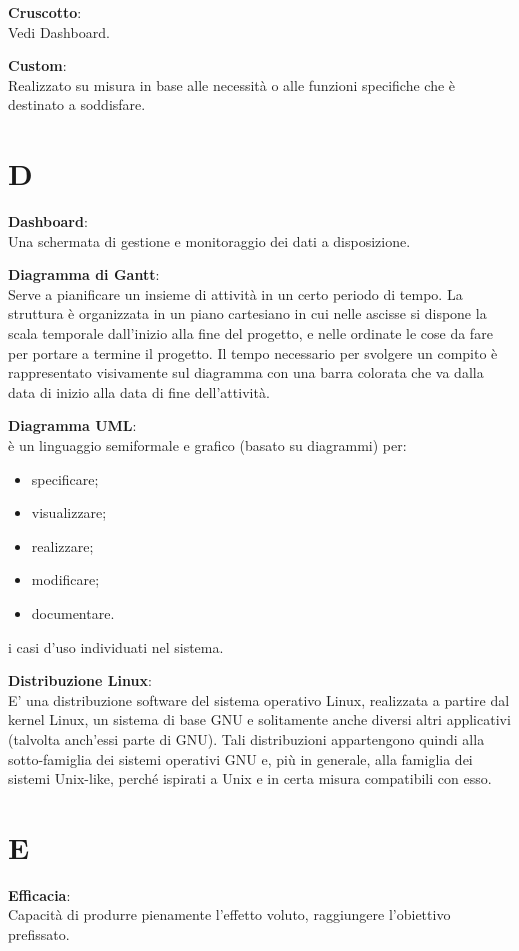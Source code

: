 \documentclass[a4paper, oneside, openany, dvipsnames, table]{article}
\begin{document}
\textbf{Cruscotto}:\\	Vedi Dashboard.

\textbf{Custom}:\\	Realizzato su misura in base alle necessità  o alle funzioni specifiche che è destinato a soddisfare.	


\newpage
\section{D}
\textbf{Dashboard}:	\\Una schermata di gestione e monitoraggio dei dati a disposizione.

\textbf{Diagramma di Gantt}:\\	Serve a pianificare un insieme di attività in un certo periodo di tempo. La struttura è organizzata in un piano cartesiano in cui nelle ascisse si dispone la scala temporale dall’inizio alla fine del progetto, e nelle ordinate le cose da fare per portare a termine il progetto. Il tempo necessario per svolgere un compito è rappresentato visivamente sul diagramma con una barra colorata che va dalla data di inizio alla data di fine dell’attività.

\textbf{Diagramma UML}:\\è un linguaggio semiformale e grafico (basato su diagrammi) per:
\begin{itemize}
\item specificare;
\item visualizzare;
\item realizzare;
\item modificare;
\item documentare.
\end{itemize}
i casi d'uso individuati nel sistema.

\textbf{Distribuzione Linux}:\\	E' una distribuzione software del sistema operativo Linux, realizzata a partire dal kernel Linux, un sistema di base GNU e solitamente anche diversi altri applicativi (talvolta anch'essi parte di GNU). Tali distribuzioni appartengono quindi alla sotto-famiglia dei sistemi operativi GNU e, più in generale, alla famiglia dei sistemi Unix-like, perché ispirati a Unix e in certa misura compatibili con esso.


\newpage
\section{E}
\textbf{Efficacia}:\\	Capacità di produrre pienamente l’effetto voluto, raggiungere l'obiettivo prefissato.
\end{document}
